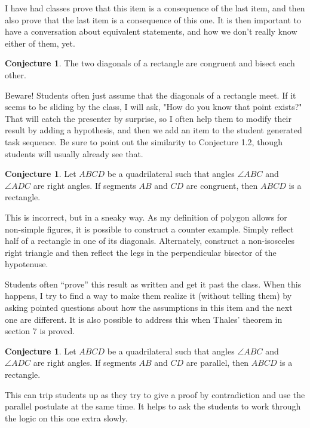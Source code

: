 \documentclass{tufte-handout}
\theoremstyle{definition}
\newtheorem{conjecture}[problem]{Conjecture}
\begin{document}
I have had classes prove that this item is a consequence of the last item, and then also prove that the last item is a consequence of this one. It is then important to have a conversation about equivalent statements, and how we don't really know either of them, yet.

\begin{conjecture}
\label{conj:rectangle-diagonals}
The two diagonals of a rectangle are congruent and bisect each other.
\end{conjecture}

Beware! Students often just assume that the diagonals of a rectangle meet. If it seems to be sliding by the class, I will ask, "How do you know that point exists?" That will catch the presenter by surprise, so I often help them to modify their result by adding a hypothesis, and then we add an item to the student generated task sequence. Be sure to point out the similarity to Conjecture 1.2, though students will usually already see that.


\begin{conjecture}
\label{conj:opp-congruent-implies-rectangle}
Let $ABCD$ be a quadrilateral such that angles $\angle ABC$ and $\angle ADC$ are right angles.
If segments $AB$ and $CD$ are congruent, then $ABCD$ is a rectangle.
\end{conjecture}

This is incorrect, but in a sneaky way. As my definition of polygon allows for non-simple figures, it is possible to construct a counter example. Simply reflect half of a rectangle in one of its diagonals. Alternately, construct a non-isosceles right triangle and then reflect the legs in the perpendicular bisector of the hypotenuse.

Students often ``prove'' this result as written and get it past the class. When this happens, I try to find a way to make them realize it (without telling them) by asking pointed questions about how the assumptions in this item and the next one are different. 
It is also possible to address this when Thales' theorem in section 7 is proved.


\begin{conjecture}
\label{conj:opp-parallel-implies-rectangle}
Let $ABCD$ be a quadrilateral such that angles $\angle ABC$ and $\angle ADC$ are right angles.
If segments $AB$ and $CD$ are parallel, then $ABCD$ is a rectangle.
\end{conjecture}

This can trip students up as they try to give a proof by contradiction and use the parallel postulate at the same time. It helps to ask the students to work through the logic on this one extra slowly.
\end{document}
